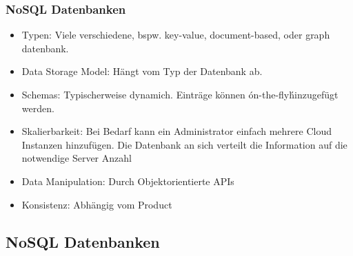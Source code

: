 		\subsubsection{NoSQL Datenbanken}
			\begin{itemize}
				\item Typen: Viele verschiedene, bspw. key-value, document-based, oder graph datenbank.
				\item Data Storage Model: Hängt vom Typ der Datenbank ab.
				\item Schemas: Typischerweise dynamich. Einträge können \'on-the-fly\' hinzugefügt werden.
				\item Skalierbarkeit: Bei Bedarf kann ein Administrator einfach mehrere Cloud Instanzen hinzufügen. Die Datenbank an sich verteilt die Information auf die notwendige Server Anzahl
				\item Data Manipulation: Durch Objektorientierte APIs
				\item Konsistenz: Abhängig vom Product
			\end{itemize}

	\subsection{NoSQL Datenbanken}

